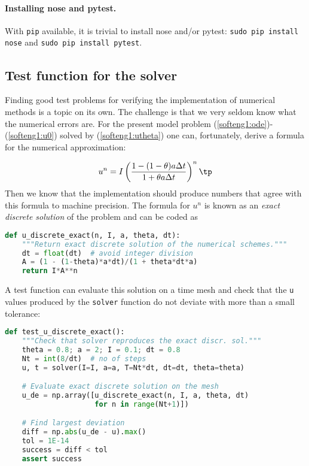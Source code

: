 \documentclass[graybox,sectrefs,envcountresetchap,open=right,final]{svmonodo}
\begin{document}
\paragraph{Installing nose and pytest.}
With \texttt{pip} available, it is trivial to install nose and/or pytest:
\texttt{sudo pip install nose} and \texttt{sudo pip install pytest}.

\subsection{Test function for the solver}

Finding good test problems for verifying the implementation of numerical
methods is a topic on its own. The challenge is that we very seldom know
what the numerical errors are. For the present model problem
(\ref{softeng1:ode})-(\ref{softeng1:u0}) solved by
(\ref{softeng1:utheta}) one can, fortunately, derive a formula for
the numerical approximation:

\[ u^n = I\left(
\frac{1 - (1-\theta) a\Delta t}{1 + \theta a \Delta t}
\right)^n\tp\]
Then we know that the implementation should
produce numbers that agree with this formula to machine precision.
The formula for $u^n$ is known as an \emph{exact discrete solution} of the
problem and can be coded as

\begin{lstlisting}[language=Python,style=blue1_bluegreen]
def u_discrete_exact(n, I, a, theta, dt):
    """Return exact discrete solution of the numerical schemes."""
    dt = float(dt)  # avoid integer division
    A = (1 - (1-theta)*a*dt)/(1 + theta*dt*a)
    return I*A**n
\end{lstlisting}
A test function can evaluate this solution on a time mesh
and check that the \texttt{u} values produced by the \texttt{solver} function
do not deviate with more than a small tolerance:

\begin{lstlisting}[language=Python,style=blue1_bluegreen]
def test_u_discrete_exact():
    """Check that solver reproduces the exact discr. sol."""
    theta = 0.8; a = 2; I = 0.1; dt = 0.8
    Nt = int(8/dt)  # no of steps
    u, t = solver(I=I, a=a, T=Nt*dt, dt=dt, theta=theta)

    # Evaluate exact discrete solution on the mesh
    u_de = np.array([u_discrete_exact(n, I, a, theta, dt)
                     for n in range(Nt+1)])

    # Find largest deviation
    diff = np.abs(u_de - u).max()
    tol = 1E-14
    success = diff < tol
    assert success
\end{lstlisting}
\end{document}

